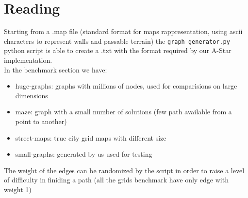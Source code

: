 \section{Reading}
\label{Sec:reading}

Starting from a .map file (standard format for maps rappresentation, using ascii characters to represent walls and passable terrain)
the \verb|graph_generator.py| python script is able to create a .txt with the format required by our A-Star implementation. \\
In the benchmark section we have:
\begin{itemize}
	\item huge-graphs: graphs with millions of nodes, used for comparisions on large dimensions
	\item maze: graph with a small number of solutions (few path available from a point to another)
	\item street-maps: true city grid maps with different size
	\item small-graphs: generated by us used for testing
\end{itemize}

The weight of the edges can be randomized by the script in order to raise a level of difficulty in finiding a path (all the grids benchmark have only edge with weight 1)

